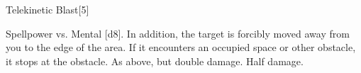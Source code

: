 
\begin{spellsection}{Telekinetic Blast}[5]
    \begin{spellheader}
    \end{spellheader}
    \begin{spellcontent}
        \begin{spelltargetinginfo}
        \end{spelltargetinginfo}
        \begin{spelleffects}
            \begin{spellattack}{Spellpower vs. Mental}
                \spellsuccess {}[d8].
                In addition, the target is forcibly moved away from you to the edge of the area.
                If it encounters an occupied space or other obstacle, it stops at the obstacle.
                \spellcritical As above, but double damage.
                \spellfailure Half damage.
            \end{spellattack}
        \end{spelleffects}
    \end{spellcontent}
    \begin{spellfooter}
        \miscastexplode
    \end{spellfooter}
    \begin{spellaugments}
    \end{spellaugments}
\end{spellsection}


